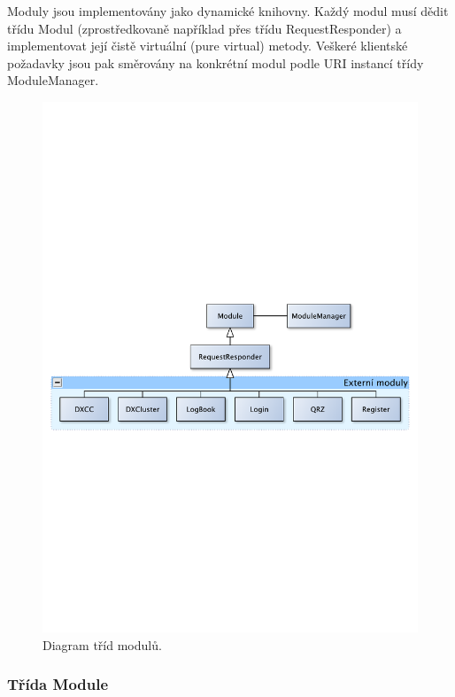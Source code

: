 Moduly jsou implementovány jako dynamické knihovny. Každý modul musí dědit třídu Modul (zprostředkovaně například přes třídu RequestResponder)
a implementovat její čistě virtuální
(pure virtual) metody. %
Veškeré klientské požadavky jsou pak směrovány na konkrétní modul podle URI instancí třídy ModuleManager.


\begin{figure}[h]
\centering
\includegraphics[trim=10cm 10cm 10cm 10cm, scale=0.7]{fig/moduly}
\caption{Diagram tříd modulů.}
\label{fig:FigureExample}
\end{figure}

\subsubsection{Třída Module}

